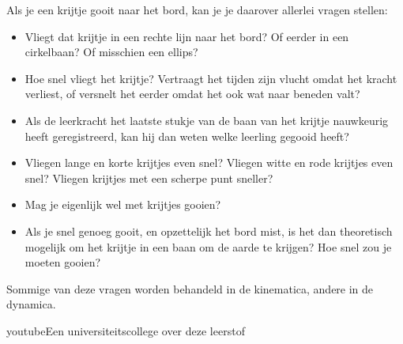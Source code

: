 \documentclass{ximera}
\begin{document}
\begin{example}
Als je een krijtje gooit naar het bord, kan je je daarover allerlei vragen stellen:
\begin{itemize}
\item Vliegt dat krijtje in een rechte lijn naar het bord? Of eerder in een cirkelbaan? Of misschien een ellips?
\item Hoe snel vliegt het krijtje? Vertraagt het tijden zijn vlucht omdat het kracht verliest, of versnelt het eerder omdat het ook wat naar beneden valt? 
\item Als de leerkracht het laatste stukje van de baan van het krijtje nauwkeurig heeft geregistreerd, kan hij dan weten welke leerling gegooid heeft?
\item Vliegen lange en korte krijtjes even snel? Vliegen witte en rode krijtjes even snel? Vliegen krijtjes met een scherpe punt sneller?
\item Mag je eigenlijk wel met krijtjes gooien?
\item Als je snel genoeg gooit, en opzettelijk het bord mist, is het dan theoretisch mogelijk om het krijtje in een baan om de aarde te krijgen? Hoe snel zou je moeten gooien? 
\end{itemize}  

Sommige van deze vragen worden behandeld in de kinematica, andere in de dynamica. 

\end{example}

\begin{expandable}{youtube}{Een universiteitscollege over deze leerstof}
\end{expandable}
\end{document}
